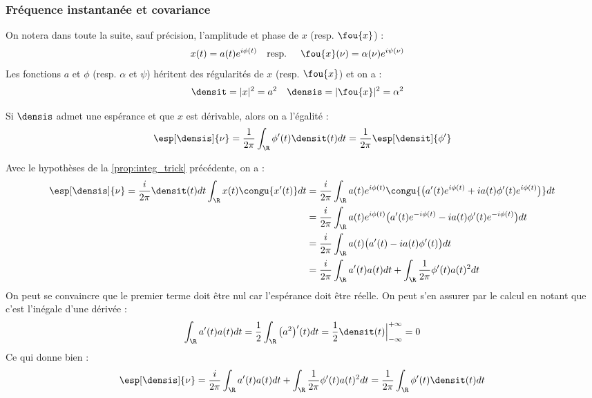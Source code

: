 \subsubsection{Fréquence instantanée et covariance}\label{subsec:freq_instant}

On notera dans toute la suite, sauf précision, l'amplitude et phase de $x$ (resp. $\fou{x}$) :
\begin{align*}
	x(t) &= a(t) e^{i\phi(t)}  &  \text{resp. }\quad \fou{x}(\nu) &= \alpha(\nu) e^{i\psi(\nu)}
\end{align*}
Les fonctions $a$ et $\phi$ (resp. $\alpha$ et $\psi$) héritent des régularités de $x$ (resp. $\fou{x}$) et on a :
\begin{align*}
	\densit &= |x|^2 = a^2  &  \densis &= |\fou{x}|^2 = \alpha^2
\end{align*}

\begin{proposition}\label{prop.esp_freq}
	Si $\densis$ admet une espérance et que $x$ est dérivable, alors on a l'égalité :
	\begin{equation}\label{eq:esp_freq}
		\esp[\densis]{\nu} = \frac{1}{2\pi}\int_\R \phi'(t)\densit(t)dt = \frac{1}{2\pi} \esp[\densit]{\phi'}
	\end{equation}
\end{proposition}

	
\begin{demo} 
	Avec le hypothèses de la \cref{prop:integ_trick} précédente, on a :
	\begin{align*}
		\esp[\densis]{\nu} = \frac{i}{2\pi} \densit(t)dt\int_\R x(t) \congu{x'(t)} dt &= \frac{i}{2\pi}\int_\R a(t)e^{i\phi(t)}\congu{\big( a'(t)e^{i\phi(t)}+ ia(t)\phi'(t)e^{i\phi(t)} \big)} dt \\
		&= \frac{i}{2\pi}\int_\R a(t)e^{i\phi(t)}\big( a'(t)e^{-i\phi(t)} -ia(t)\phi'(t)e^{-i\phi(t)} \big) dt \\
		&= \frac{i}{2\pi}\int_\R a(t)\big( a'(t)- ia(t)\phi'(t)\big) dt \\
		&= \frac{i}{2\pi}\int_\R a'(t)a(t) dt + \int_\R  \frac{1}{2\pi}\phi'(t)a(t)^2 dt \\
	\end{align*}
	On peut se convaincre que le premier terme doit être nul car l'espérance doit être réelle. On peut s'en assurer par le calcul en notant que c'est l’inégale d'une dérivée :
	\[\int_\R a'(t)a(t) dt = \frac{1}{2} \int_\R \big(a^2\big)'(t) dt = \frac{1}{2}\densit(t)\Big|_{-\infty}^{+\infty} = 0\]
	Ce qui donne bien :
	\[\esp[\densis]{\nu} = \frac{i}{2\pi}\int_\R a'(t)a(t) dt + \int_\R  \frac{1}{2\pi}\phi'(t)a(t)^2 dt = \frac{1}{2\pi}\int_\R \phi'(t)\densit(t) dt\]
\end{demo}



